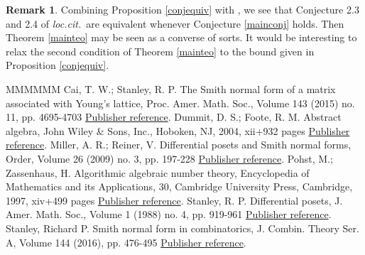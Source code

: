 \documentclass[11pt]{article}
\theoremstyle{definition}
\newtheorem{remark}[theo]{Remark}
\numberwithin{equation}{section}
\begin{document}
   


\begin{remark}   Combining Proposition \ref{conjequiv} with  \cite[Proposition 2.5]{Miller}, we see that Conjecture 2.3 and 2.4 of \emph{loc.cit.}\ are equivalent whenever Conjecture \ref{mainconj} holds. Then  Theorem \ref{mainteo} may  be seen as a converse of sorts.  It would be interesting to relax the second condition of Theorem \ref{mainteo} to the  bound given in Proposition \ref{conjequiv}. 
\end{remark}  

\begin{thebibliography}{MMMMMM}
 Cai, T. W.; Stanley, R. P. The Smith normal form of a matrix associated with Young’s lattice, Proc. Amer. Math. Soc., Volume 143 (2015) no. 11, pp. 4695-4703 \href{https://alco.centre-mersenne.org/articles/10.5802/alco.393/#SNFforYoung}{Publisher reference}.
 Dummit, D. S.; Foote, R. M. Abstract algebra, John Wiley \& Sons, Inc., Hoboken, NJ, 2004, xii+932 pages \href{https://alco.centre-mersenne.org/articles/10.5802/alco.393/#D&F}{Publisher reference}.
 Miller, A. R.; Reiner, V. Differential posets and Smith normal forms, Order, Volume 26 (2009) no. 3, pp. 197-228 \href{https://alco.centre-mersenne.org/articles/10.5802/alco.393/#Miller}{Publisher reference}.
 Pohst, M.; Zassenhaus, H. Algorithmic algebraic number theory, Encyclopedia of Mathematics and its Applications, 30, Cambridge University Press, Cambridge, 1997, xiv+499 pages \href{https://alco.centre-mersenne.org/articles/10.5802/alco.393/#Zassenhaus}{Publisher reference}.
 Stanley, R. P. Differential posets, J. Amer. Math. Soc., Volume 1 (1988) no. 4, pp. 919-961 \href{https://alco.centre-mersenne.org/articles/10.5802/alco.393/#Stanley88}{Publisher reference}.
 Stanley, Richard P. Smith normal form in combinatorics, J. Combin. Theory Ser. A, Volume 144 (2016), pp. 476-495 \href{https://alco.centre-mersenne.org/articles/10.5802/alco.393/#SNFsurvey}{Publisher reference}.
\end{thebibliography}
\end{document}
